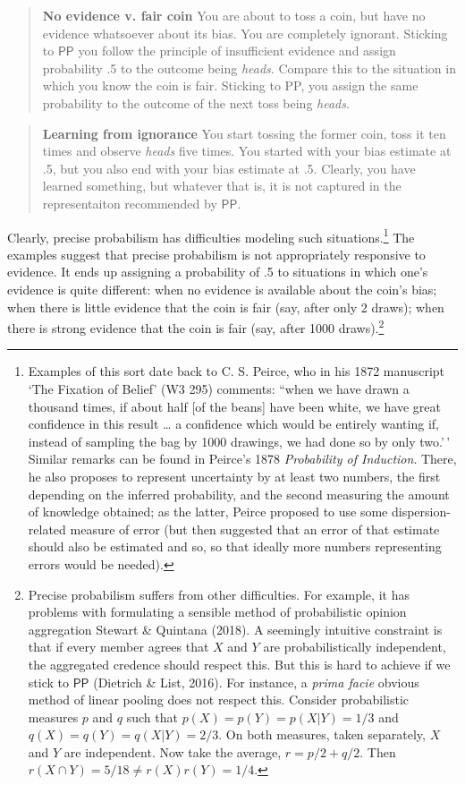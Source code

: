 \documentclass[
  10pt,
  dvipsnames,enabledeprecatedfontcommands]{scrartcl}
\newcommand{\s}[1]{\mbox{$\mathsf{#1}$}}
\begin{document}
\begin{quote}
\textbf{No evidence v. fair coin}
You are about to toss a coin, but have no evidence 
whatsoever about its bias. You are completely ignorant. Sticking to \s{PP} you  follow the principle of insufficient evidence and assign probability .5 to the outcome being \emph{heads}.  Compare this to the situation  in which you know the coin is fair. Sticking to PP, you assign the same probability to the outcome of the next toss being \emph{heads}. 
\end{quote}

\begin{quote}
\textbf{Learning from ignorance}
You start  tossing the former coin, toss it ten times and observe \emph{heads} five times. You started with your bias estimate at .5, but you also end with your bias estimate at .5. Clearly, you have learned something, but whatever that is, it is not captured in the representaiton recommended by \s{PP}.
\end{quote}

\noindent Clearly, precise probabilism has difficulties modeling such
situations.\footnote{Examples of this sort date back to C. S. Peirce,
  who in his 1872 manuscript `The Fixation of Belief' (W3 295) comments:
  ``when we have drawn a thousand times, if about half {[}of the
  beans{]} have been white, we have great confidence in this result
  \ldots{} a confidence which would be entirely wanting if, instead of
  sampling the bag by 1000 drawings, we had done so by only two.'\,'
  Similar remarks can be found in Peirce's 1878
  \emph{Probability of Induction}. There, he also proposes to represent
  uncertainty by at least two numbers, the first depending on the
  inferred probability, and the second measuring the amount of knowledge
  obtained; as the latter, Peirce proposed to use some
  dispersion-related measure of error (but then suggested that an error
  of that estimate should also be estimated and so, so that ideally more
  numbers representing errors would be needed).} The examples suggest
that precise probabilism is not appropriately responsive to evidence. It
ends up assigning a probability of .5 to situations in which one's
evidence is quite different: when no evidence is available about the
coin's bias; when there is little evidence that the coin is fair (say,
after only 2 draws); when there is strong evidence that the coin is fair
(say, after 1000 draws).\footnote{Precise probabilism suffers from other
  difficulties. For example, it has problems with formulating a sensible
  method of probabilistic opinion aggregation Stewart \& Quintana
  (2018). A seemingly intuitive constraint is that if every member
  agrees that \(X\) and \(Y\) are probabilistically independent, the
  aggregated credence should respect this. But this is hard to achieve
  if we stick to \s{PP} (Dietrich \& List, 2016). For instance, a
  \emph{prima facie} obvious method of linear pooling does not respect
  this. Consider probabilistic measures \(p\) and \(q\) such that
  \(p(X) = p(Y) = p(X\vert Y) = 1/3\) and
  \(q(X) = q(Y) = q(X\vert Y) = 2/3\). On both measures, taken
  separately, \(X\) and \(Y\) are independent. Now take the average,
  \(r=p/2+q/2\). Then \(r(X\cap Y) = 5/18 \neq r(X)r(Y)=1/4\).}
\end{document}
